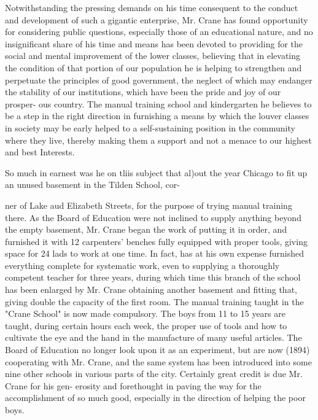 \documentclass[oneside]{book}
\begin{document}
Notwithstanding the pressing demands on his time consequent 
to the conduct and development of such a gigantic enterprise, 
Mr. Crane has found opportunity for considering public questions, 
especially those of an educational nature, and no insignificant 
share of his time and means has been devoted to providing for 
the social and mental improvement of the lower classes, believing 
that in elevating the condition of that portion of our population 
he is helping to strengthen and perpetuate the principles of good 
government, the neglect of which may endanger the stability of 
our institutions, which have been the pride and joy of our prosper- 
ous country. The manual training school and kindergarten he 
believes to be a step in the right direction in furnishing a means 
by which the louver classes in society may be early helped to a 
self-sustaining position in the community where they live, thereby 
making them a support and not a menace to our highest and best 
Interests. 

So much in earnest was he on tliis subject that al)out the year 
Chicago to fit up an unused basement in the Tilden School, cor- 




ner of Lake aud Elizabeth Streets, for the purpose of trying 
manual training there. As the Board of Education were not 
inclined to supply anything beyond the empty basement, Mr. 
Crane began the work of putting it in order, and furnished it 
with 12 carpenters' benches fully equipped with proper tools, 
giving space for 24 lads to work at one time. In fact, has at his 
own expense furnished everything complete for systematic work, 
even to supplying a thoroughly competent teacher for three years, 
during which time this branch of the school has been enlarged by 
Mr. Crane obtaining another basement and fitting that, giving 
double the capacity of the first room. The manual training 
taught in the "Crane School" is now made compulsory. The 
boys from 11 to 15 years are taught, during certain hours each 
week, the proper use of tools and how to cultivate the eye and 
the hand in the manufacture of many useful articles. The Board 
of Education no longer look upon it as an experiment, but are 
now (1894) cooperating with Mr. Crane, and the same system 
has been introduced into some nine other schools in various parts 
of the city. Certainly great credit is due Mr. Crane for his gen- 
erosity and forethought in paving the way for the accomplishment 
of so much good, especially in the direction of helping the poor 
boys. 
\end{document}
